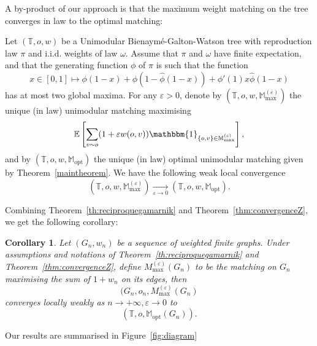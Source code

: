 \documentclass[11pt]{article}
\newtheorem{coro}{Corollary}[section]
\newcommand{\eps}{\varepsilon}
\begin{document}
\bigskip

A by-product of our approach is that the maximum weight matching on the tree converges in law to the optimal matching:

\begin{theorem}\label{thm:convergenceZ}
    Let $(\mathbb{T},o,w)$ be a Unimodular Bienaymé-Galton-Watson tree with reproduction law $\pi$ and i.i.d. weights of law $\omega$.
    Assume that $\pi$ and $\omega$ have finite expectation, and that the generating function $\phi$ of $\pi$ is such that the function
    \[x \in [0,1] \mapsto \phi(1-x) + \phi(1-\hat\phi(1-x)) + \phi'(1) x \hat\phi(1-x)\]
    has at most two global maxima.
    For any $\eps>0$, denote by $(\mathbb{T},o,w, \mathbb{M}_{\max}^{(\eps)})$ the unique (in law) unimodular matching maximising
    \[  \mathbb{E}\left[ \sum_{v\sim o}(1+ \varepsilon w(o,v)) \mathbbm{1}_{ \{o,v\} \in \mathbb{M}_{\max}^{(\eps)} }\right],\]
    and by $(\mathbb{T},o,w,\mathbb{M}_{\mathrm{opt}})$ the unique (in law) optimal unimodular matching 
     given by Theorem~\ref{maintheorem}. We have the following weak local convergence
    \[(\mathbb{T},o,w, \mathbb{M}_{\max}^{(\eps)}) \underset{\eps \rightarrow 0}{\longrightarrow} (\mathbb{T},o,w, \mathbb{M}_{\mathrm{opt}}).\]
\end{theorem}

\bigskip

Combining Theorem~\ref{th:reciproquegamarnik} and Theorem~\ref{thm:convergenceZ}, we get the following corollary:

\begin{coro}\label{coro:convergenceepsilonn}
    Let $(G_n,w_n)$ be a sequence of weighted finite graphs.
    Under assumptions and notations of Theorem~\ref{th:reciproquegamarnik} and Theorem~\ref{thm:convergenceZ}, define $M_{\max}^{(\eps)}(G_n)$ to be the matching on $G_n$ maximising the sum of $1+w_n$ on its edges, then
    \[  (G_n,o_n, M_{\max}^{(\eps)}(G_n)  \]
    converges locally weakly as $n \to +\infty, \eps \to 0$ to
    \[ \left( \mathbb{T},o,\mathbb{M}_{\mathrm{opt}}(G_n) \right) . \]
\end{coro}
\bigskip

Our results are summarised in Figure~\ref{fig:diagram}
\end{document}
